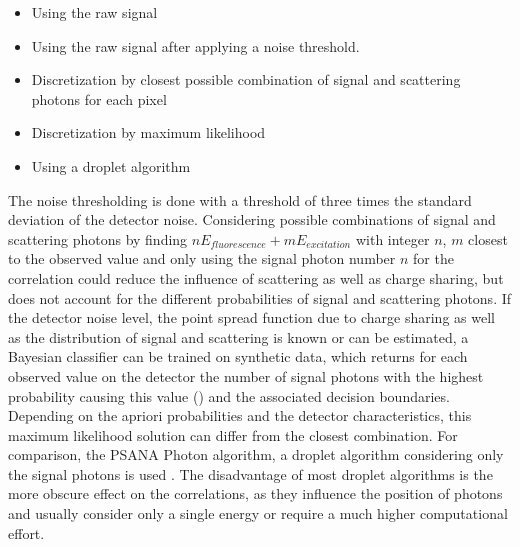 \begin{itemize}[nosep]
	\item Using the raw signal
	\item Using the raw signal after applying a noise threshold.
	\item Discretization by closest possible combination of signal and scattering photons for each pixel
	\item Discretization by maximum likelihood
	\item Using a droplet algorithm
\end{itemize}

The noise thresholding is done with a threshold of three times the standard deviation of the detector noise. Considering possible combinations of signal and scattering photons by finding  $nE_{fluorescence}+mE_{excitation}$ with integer $n$, $m$ closest to the observed value and only using the signal photon number $n$ for the correlation could reduce the influence of scattering as well as charge sharing, but does not account for the different probabilities of signal and scattering photons. If the detector noise level, the point spread function due to charge sharing as well as the distribution of signal and scattering is known or can be estimated, a Bayesian classifier can be trained on synthetic data, which returns for each observed value on the detector the number of signal photons with the highest probability causing this value () and the associated decision boundaries. Depending on the apriori probabilities and the detector characteristics, this maximum likelihood solution can differ from the closest combination. For comparison, the PSANA Photon algorithm, a droplet algorithm considering only the signal photons is used \cite{psana}. The disadvantage of most droplet algorithms is the more obscure effect on the correlations, as they influence the position of photons and usually consider only a single energy or require a much higher computational effort.  

